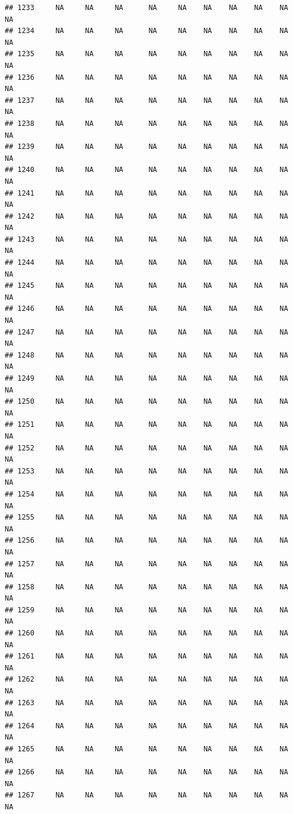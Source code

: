 \documentclass{article}\usepackage{graphicx, color}
\makeatletter
\newenvironment{kframe}{%
 \def\at@end@of@kframe{}%
 \ifinner\ifhmode%
  \def\at@end@of@kframe{\end{minipage}}%
  \begin{minipage}{\columnwidth}%
 \fi\fi%
 \def\FrameCommand##1{\hskip\@totalleftmargin \hskip-\fboxsep
 \colorbox{shadecolor}{##1}\hskip-\fboxsep
     \hskip-\linewidth \hskip-\@totalleftmargin \hskip\columnwidth}%
 \MakeFramed {\advance\hsize-\width
   \@totalleftmargin\z@ \linewidth\hsize
   \@setminipage}}%
 {\par\unskip\endMakeFramed%
 \at@end@of@kframe}
\newenvironment{knitrout}{}{} %
\makeatother
\begin{document}
\begin{knitrout}
\begin{kframe}
\begin{verbatim}
## 1233     NA     NA     NA      NA     NA    NA    NA    NA    NA     NA
## 1234     NA     NA     NA      NA     NA    NA    NA    NA    NA     NA
## 1235     NA     NA     NA      NA     NA    NA    NA    NA    NA     NA
## 1236     NA     NA     NA      NA     NA    NA    NA    NA    NA     NA
## 1237     NA     NA     NA      NA     NA    NA    NA    NA    NA     NA
## 1238     NA     NA     NA      NA     NA    NA    NA    NA    NA     NA
## 1239     NA     NA     NA      NA     NA    NA    NA    NA    NA     NA
## 1240     NA     NA     NA      NA     NA    NA    NA    NA    NA     NA
## 1241     NA     NA     NA      NA     NA    NA    NA    NA    NA     NA
## 1242     NA     NA     NA      NA     NA    NA    NA    NA    NA     NA
## 1243     NA     NA     NA      NA     NA    NA    NA    NA    NA     NA
## 1244     NA     NA     NA      NA     NA    NA    NA    NA    NA     NA
## 1245     NA     NA     NA      NA     NA    NA    NA    NA    NA     NA
## 1246     NA     NA     NA      NA     NA    NA    NA    NA    NA     NA
## 1247     NA     NA     NA      NA     NA    NA    NA    NA    NA     NA
## 1248     NA     NA     NA      NA     NA    NA    NA    NA    NA     NA
## 1249     NA     NA     NA      NA     NA    NA    NA    NA    NA     NA
## 1250     NA     NA     NA      NA     NA    NA    NA    NA    NA     NA
## 1251     NA     NA     NA      NA     NA    NA    NA    NA    NA     NA
## 1252     NA     NA     NA      NA     NA    NA    NA    NA    NA     NA
## 1253     NA     NA     NA      NA     NA    NA    NA    NA    NA     NA
## 1254     NA     NA     NA      NA     NA    NA    NA    NA    NA     NA
## 1255     NA     NA     NA      NA     NA    NA    NA    NA    NA     NA
## 1256     NA     NA     NA      NA     NA    NA    NA    NA    NA     NA
## 1257     NA     NA     NA      NA     NA    NA    NA    NA    NA     NA
## 1258     NA     NA     NA      NA     NA    NA    NA    NA    NA     NA
## 1259     NA     NA     NA      NA     NA    NA    NA    NA    NA     NA
## 1260     NA     NA     NA      NA     NA    NA    NA    NA    NA     NA
## 1261     NA     NA     NA      NA     NA    NA    NA    NA    NA     NA
## 1262     NA     NA     NA      NA     NA    NA    NA    NA    NA     NA
## 1263     NA     NA     NA      NA     NA    NA    NA    NA    NA     NA
## 1264     NA     NA     NA      NA     NA    NA    NA    NA    NA     NA
## 1265     NA     NA     NA      NA     NA    NA    NA    NA    NA     NA
## 1266     NA     NA     NA      NA     NA    NA    NA    NA    NA     NA
## 1267     NA     NA     NA      NA     NA    NA    NA    NA    NA     NA

\end{verbatim}
\end{kframe}
\end{knitrout}
\end{document}
